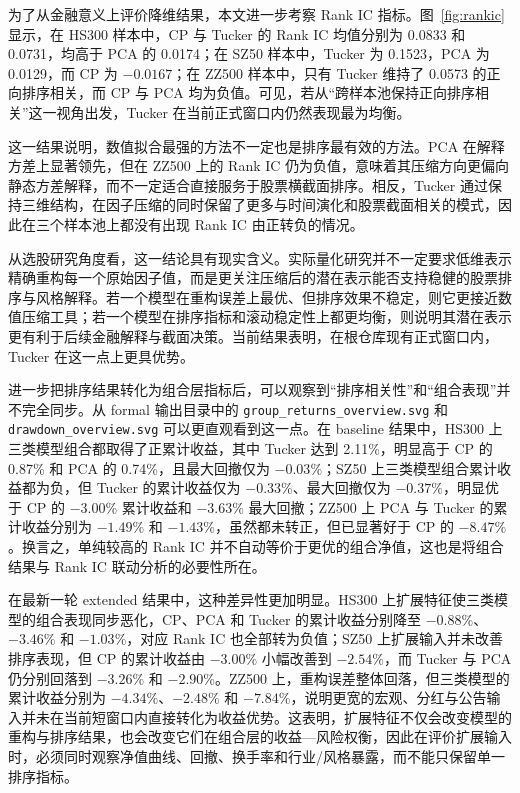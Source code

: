 为了从金融意义上评价降维结果，本文进一步考察 Rank IC 指标。图~\ref{fig:rankic} 显示，在 HS300 样本中，CP 与 Tucker 的 Rank IC 均值分别为 0.0833 和 0.0731，均高于 PCA 的 0.0174；在 SZ50 样本中，Tucker 为 0.1523，PCA 为 0.0129，而 CP 为 $-0.0167$；在 ZZ500 样本中，只有 Tucker 维持了 0.0573 的正向排序相关，而 CP 与 PCA 均为负值。可见，若从“跨样本池保持正向排序相关”这一视角出发，Tucker 在当前正式窗口内仍然表现最为均衡。

这一结果说明，数值拟合最强的方法不一定也是排序最有效的方法。PCA 在解释方差上显著领先，但在 ZZ500 上的 Rank IC 仍为负值，意味着其压缩方向更偏向静态方差解释，而不一定适合直接服务于股票横截面排序。相反，Tucker 通过保持三维结构，在因子压缩的同时保留了更多与时间演化和股票截面相关的模式，因此在三个样本池上都没有出现 Rank IC 由正转负的情况。

从选股研究角度看，这一结论具有现实含义。实际量化研究并不一定要求低维表示精确重构每一个原始因子值，而是更关注压缩后的潜在表示能否支持稳健的股票排序与风格解释。若一个模型在重构误差上最优、但排序效果不稳定，则它更接近数值压缩工具；若一个模型在排序指标和滚动稳定性上都更均衡，则说明其潜在表示更有利于后续金融解释与截面决策。当前结果表明，在根仓库现有正式窗口内，Tucker 在这一点上更具优势。

进一步把排序结果转化为组合层指标后，可以观察到“排序相关性”和“组合表现”并不完全同步。从 formal 输出目录中的 \texttt{group\_returns\_overview.svg} 和 \texttt{drawdown\_overview.svg} 可以更直观看到这一点。在 baseline 结果中，HS300 上三类模型组合都取得了正累计收益，其中 Tucker 达到 2.11\%，明显高于 CP 的 0.87\% 和 PCA 的 0.74\%，且最大回撤仅为 $-0.03\%$；SZ50 上三类模型组合累计收益都为负，但 Tucker 的累计收益仅为 $-0.33\%$、最大回撤仅为 $-0.37\%$，明显优于 CP 的 $-3.00\%$ 累计收益和 $-3.63\%$ 最大回撤；ZZ500 上 PCA 与 Tucker 的累计收益分别为 $-1.49\%$ 和 $-1.43\%$，虽然都未转正，但已显著好于 CP 的 $-8.47\%$。换言之，单纯较高的 Rank IC 并不自动等价于更优的组合净值，这也是将组合结果与 Rank IC 联动分析的必要性所在。

在最新一轮 extended 结果中，这种差异性更加明显。HS300 上扩展特征使三类模型的组合表现同步恶化，CP、PCA 和 Tucker 的累计收益分别降至 $-0.88\%$、$-3.46\%$ 和 $-1.03\%$，对应 Rank IC 也全部转为负值；SZ50 上扩展输入并未改善排序表现，但 CP 的累计收益由 $-3.00\%$ 小幅改善到 $-2.54\%$，而 Tucker 与 PCA 仍分别回落到 $-3.26\%$ 和 $-2.90\%$。ZZ500 上，重构误差整体回落，但三类模型的累计收益分别为 $-4.34\%$、$-2.48\%$ 和 $-7.84\%$，说明更宽的宏观、分红与公告输入并未在当前短窗口内直接转化为收益优势。这表明，扩展特征不仅会改变模型的重构与排序结果，也会改变它们在组合层的收益—风险权衡，因此在评价扩展输入时，必须同时观察净值曲线、回撤、换手率和行业/风格暴露，而不能只保留单一排序指标。

